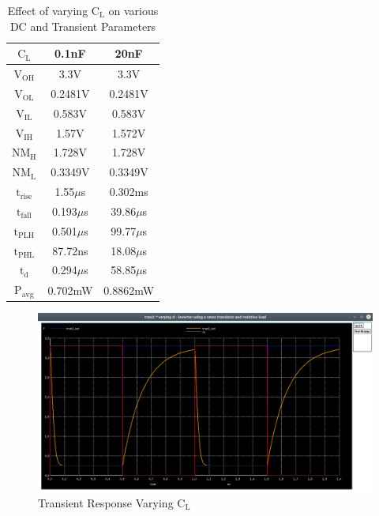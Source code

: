 \documentclass[12pt]{article}
\begin{document}
	\begin{table}[H]
		\begin{center}
			\begin{tabular}{|c|c|c|}
				\hline 
				\rule[-1ex]{0pt}{2.5ex} $\text{C}_\text{L}$ & 0.1nF & 20nF\\ 
				\hline 
				\rule[-1ex]{0pt}{2.5ex} 
				$\text{V}_\text{OH}$ & 3.3V & 3.3V  \\ 
				$\text{V}_\text{OL}$ & 0.2481V & 0.2481V \\ 
				$\text{V}_\text{IL}$ & 0.583V & 0.583V \\ 
				$\text{V}_\text{IH}$ & 1.57V & 1.572V \\ 
				$\text{NM}_\text{H}$ & 1.728V & 1.728V\\ 
				$\text{NM}_\text{L}$ & 0.3349V & 0.3349V \\ 
				$\text{t}_\text{rise}$ & 1.55$\mu$s & 0.302ms\\ 
				$\text{t}_\text{fall}$ & 0.193$\mu$s & 39.86$\mu$s\\ 
				$\text{t}_\text{PLH}$ & 0.501$\mu$s & 99.77$\mu$s\\ 
				$\text{t}_\text{PHL}$ & 87.72ns & 18.08$\mu$s\\ 
				$\text{t}_\text{d}$ & 0.294$\mu$s & 58.85$\mu$s\\ 
				$\text{P}_\text{avg}$ & 0.702mW  & 0.8862mW\\ 
				\hline 
			\end{tabular} 
		\end{center}
		\caption{Effect of varying $\text{C}_\text{L}$ on various DC and Transient Parameters}
		\label{table::tablevarcl}
	\end{table}
	\begin{figure}[H]
		\begin{center}
			\includegraphics[scale=0.25]{images/inverter_cl_tran.png}
			\caption{Transient Response Varying $\text{C}_\text{L}$}
			\label{fig::varying_cl_tran}
		\end{center}
	\end{figure}
\end{document}

